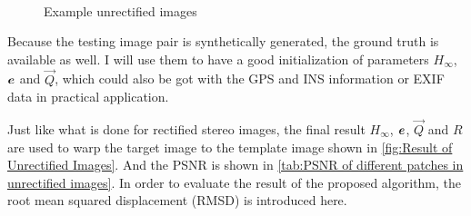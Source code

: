 \begin{figure}[htbp]\centering
	 \\
	\caption{Example unrectified images}
	\label{fig:Example unrectified images}
\end{figure}

Because the testing image pair is synthetically generated, the ground truth is available as well. I will use them to have a good initialization of parameters $H_\infty$, $\boldsymbol{e}$ and $\vec{Q}$, which could also be got with the GPS and INS information or EXIF data in practical application.

Just like what is done for rectified stereo images, the final result $H_\infty$, $\boldsymbol{e}$, $\vec{Q}$ and $R$ are used to warp the target image to the template image shown in \cref{fig:Result of Unrectified Images}. And the PSNR is shown in \cref{tab:PSNR of different patches in unrectified images}. In order to evaluate the result of the proposed algorithm, the root mean squared displacement (RMSD) is introduced here. 


